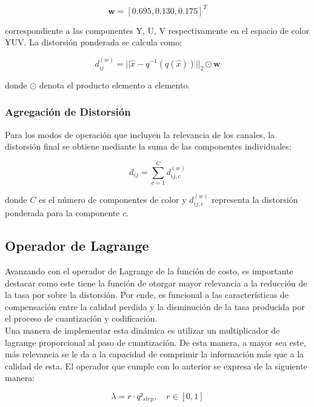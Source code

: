     \begin{equation}
        \mathbf{w} = [0.695, 0.130, 0.175]^T
    \end{equation}
    
    correspondiente a las componentes Y, U, V respectivamente en el espacio de color YUV. La distorsión ponderada se calcula como:
    
    \begin{equation}
        d_{ij}^{(w)} = ||\hat{x} - q^{-1}(q(\hat{x}))||_2 \odot \mathbf{w}
    \end{equation}
    
    donde $\odot$ denota el producto elemento a elemento.
    
    \subsubsection{Agregación de Distorsión}
    
    Para los modos de operación que incluyen la relevancia de los canales, la distorsión final se obtiene mediante la suma de las componentes individuales:
    
    \begin{equation}
        d_{ij} = \sum_{c=1}^{C} d_{ij,c}^{(w)}
    \end{equation}
    
    donde $C$ es el número de componentes de color y $d_{ij,c}^{(w)}$ representa la distorsión ponderada para la componente $c$.
    
        
    \subsection{Operador de Lagrange}
        Avanzando con el operador de Lagrange de la función de costo, es importante destacar como este tiene la función de  otorgar mayor relevancia a la reducción de la tasa por sobre la distorsión. Por ende, es funcional a las características de compensación entre la calidad perdida y la disminución de la tasa producida por el proceso de cuantización y codificación.\\
        Una manera de implementar esta dinámica es utilizar un multiplicador de lagrange proporcional al paso de cuantización. De esta manera, a mayor sea este, más relevancia se le da a la capacidad de comprimir la información más que a la calidad de esta. El operador que cumple con lo anterior se expresa de la siguiente manera:

        \begin{equation}
            \lambda =r\cdot q²_{step},\quad r\in [0,1]
        \end{equation}


